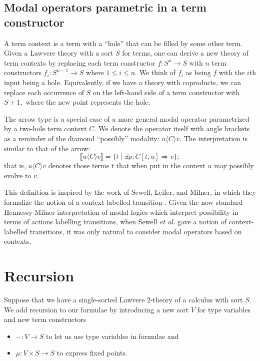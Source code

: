 \documentclass{llncs}
\newcommand{\interp}[1]{\llbracket #1 \rrbracket}
\newcommand{\maps}{\colon}
\renewcommand{\:}{\colon}
\begin{document}
\subsection{Modal operators parametric in a term constructor}

A term context is a term with a ``hole'' that can be filled by some other term.  Given a Lawvere theory with a sort $S$ for terms, one can derive a new theory of term contexts by replacing each term constructor $f\maps S^n \to S$ with $n$ term constructors $f_i\maps S^{n-1} \to S$ where $1 \le i \le n$.  We think of $f_i$ as being $f$ with the $i$th input being a hole.  Equivalently, if we have a theory with coproducts, we can replace each occurrence of $S$ on the left-hand side of a term constructor with $S+1,$ where the new point represents the hole.

The arrow type is a special case of a more general modal operator parametrized by a two-hole term context $C.$  We denote the operator itself with angle brackets as a reminder of the diamond ``possibly'' modality: $u \langle C \rangle v.$  The interpretation is similar to that of the arrow:
\[ \interp{u \langle C\rangle v} = \{ t \;|\; \exists \rho\maps C[t, u] \Rightarrow v \}; \]
that is, $u \langle C\rangle v$ denotes those terms $t$ that when put
in the context $u$ may possibly evolve to $v.$

This definition is inspired by the work of Sewell, Leifer, and Milner, in which they formalize the notion of a context-labelled transition \cite{DBLP:conf/concur/LeiferM00}.  Given the now standard Hennessy-Milner interpretation of modal logics which interpret possibility in terms of actions labelling transitions, when Sewell {\em et al.} gave a notion of context-labelled transitions, it was only natural
to consider modal operators based on contexts.

\section{Recursion}

Suppose that we have a single-sorted Lawvere 2-theory of a calculus with sort $S$.  We add recursion to our formulae by introducing a new sort $V$ for type variables and new term constructors 
\begin{itemize}
  \item $- \maps V \to S$ to let us use type variables in formulae and
  \item $\mu\maps V\times S \to S$ to express fixed points.
\end{itemize}
\end{document}
